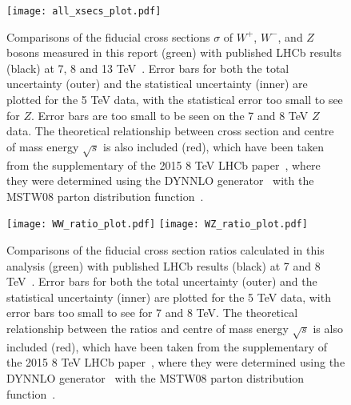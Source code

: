 \documentclass[a4paper,12pt]{article}
\begin{document}
\begin{figure}[ht]
\centering
\texttt{[image: all\_xsecs\_plot.pdf]}
\vspace{-3mm}
\caption{\small Comparisons of the fiducial cross sections $\sigma$ of $W^+$, $W^-$, and $Z$ bosons measured in this report (green) with published LHCb results (black) at 7, 8 and 13 TeV~\cite{7TeV_Z_2015,8TeV_W+Z_2015,13TeV_Z_2016}. 
Error bars for both the total uncertainty (outer) and the statistical uncertainty (inner) are plotted for the 5 TeV data, with the statistical error too small to see for $Z$. Error bars are too small to be seen on the 7 and 8 TeV $Z$ data.
The theoretical relationship between cross section and centre of mass energy $\sqrt{s}$ is also included (red), which have been taken from the supplementary of the 2015 8 TeV LHCb paper~\cite{8TeV_W+Z_2015}, where they were determined using the DYNNLO generator~\cite{DYNNLO} with the MSTW08 parton distribution function~\cite{MSTW08}.}
\label{fig: all xsec comparison}
\end{figure}

\begin{figure*}[t]
\centering
\texttt{[image: WW\_ratio\_plot.pdf]}
\texttt{[image: WZ\_ratio\_plot.pdf]} %
\vspace{-4mm}
\caption{\small Comparisons of the fiducial cross section ratios calculated in this analysis (green) with published LHCb results (black) at 7 and 8 TeV~\cite{7TeV_Z_2015,8TeV_W+Z_2015}. 
Error bars for both the total uncertainty (outer) and the statistical uncertainty (inner) are plotted for the 5 TeV data, with error bars too small to see for 7 and 8 TeV.
The theoretical relationship between the ratios and centre of mass energy $\sqrt{s}$ is also included (red), which have been taken from the supplementary of the 2015 8 TeV LHCb paper~\cite{8TeV_W+Z_2015}, where they were determined using the DYNNLO generator~\cite{DYNNLO} with the MSTW08 parton distribution function~\cite{MSTW08}.} 
\label{fig: ratio comparison}
\end{figure*}
\end{document}
